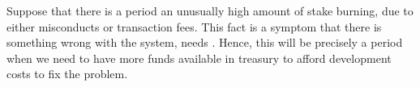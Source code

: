 Suppose that there is a period  an unusually high amount of stake burning, due to either misconducts or transaction fees. This fact is a symptom that there is something wrong with the system,  needs . Hence, this will be precisely a period when we need to have more funds available in  treasury to afford   development costs to fix the problem.

